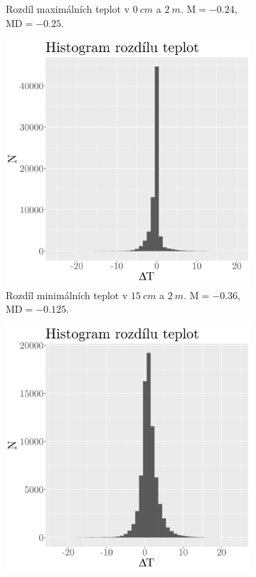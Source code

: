 \begin{figure}
\begin{subfigure}{0.45\textwidth}
		\caption{Rozdíl maximálních teplot v $\SI{0}{cm}$ a $\SI{2}{m}$. $\text{M} = -0.24$, $\text{MD} = -0.25$.}
		\label{fig:hist_diff_max0cm}
	\end{subfigure}
	\hfill
	\begin{subfigure}{0.45\textwidth}
  \includegraphics[width=\textwidth]{img/ch2/hist_diff_min15cm.png}
		\caption{Rozdíl minimálních teplot v $\SI{15}{cm}$ a $\SI{2}{m}$. $\text{M} = -0.36$, $\text{MD} = -0.125$.}
		\label{fig:hist_diff_min15cm}
	\end{subfigure}
	\hfill
	\begin{subfigure}{0.45\textwidth}
  \includegraphics[width=\textwidth]{img/ch2/hist_diff_min0cm.png}

\end{subfigure}
\end{figure}
